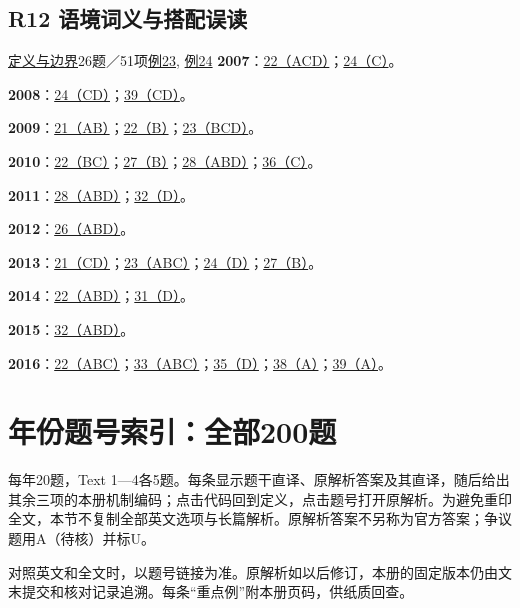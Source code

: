 \documentclass[11pt,a4paper]{article}
\begin{document}
\subsection{R12 语境词义与搭配误读}\label{class-R12}
\noindent \hyperref[cat-R12]{定义与边界}\quad 26题／51项\quad \hyperref[case-2009-T1-Q23]{例23}, \hyperref[case-2013-T1-Q21]{例24}
\noindent\textbf{2007}：\hyperref[idx-2007-T1-Q22]{22（ACD）}；\hyperref[idx-2007-T1-Q24]{24（C）}。\par
\noindent\textbf{2008}：\hyperref[idx-2008-T1-Q24]{24（CD）}；\hyperref[idx-2008-T4-Q39]{39（CD）}。\par
\noindent\textbf{2009}：\hyperref[idx-2009-T1-Q21]{21（AB）}；\hyperref[idx-2009-T1-Q22]{22（B）}；\hyperref[idx-2009-T1-Q23]{23（BCD）}。\par
\noindent\textbf{2010}：\hyperref[idx-2010-T1-Q22]{22（BC）}；\hyperref[idx-2010-T2-Q27]{27（B）}；\hyperref[idx-2010-T2-Q28]{28（ABD）}；\hyperref[idx-2010-T4-Q36]{36（C）}。\par
\noindent\textbf{2011}：\hyperref[idx-2011-T2-Q28]{28（ABD）}；\hyperref[idx-2011-T3-Q32]{32（D）}。\par
\noindent\textbf{2012}：\hyperref[idx-2012-T2-Q26]{26（ABD）}。\par
\noindent\textbf{2013}：\hyperref[idx-2013-T1-Q21]{21（CD）}；\hyperref[idx-2013-T1-Q23]{23（ABC）}；\hyperref[idx-2013-T1-Q24]{24（D）}；\hyperref[idx-2013-T2-Q27]{27（B）}。\par
\noindent\textbf{2014}：\hyperref[idx-2014-T1-Q22]{22（ABD）}；\hyperref[idx-2014-T3-Q31]{31（D）}。\par
\noindent\textbf{2015}：\hyperref[idx-2015-T3-Q32]{32（ABD）}。\par
\noindent\textbf{2016}：\hyperref[idx-2016-T1-Q22]{22（ABC）}；\hyperref[idx-2016-T3-Q33]{33（ABC）}；\hyperref[idx-2016-T3-Q35]{35（D）}；\hyperref[idx-2016-T4-Q38]{38（A）}；\hyperref[idx-2016-T4-Q39]{39（A）}。\par
{}\section{年份题号索引：全部200题}\label{year-index}
每年20题，Text 1—4各5题。每条显示题干直译、原解析答案及其直译，随后给出其余三项的本册机制编码；点击代码回到定义，点击题号打开原解析。为避免重印全文，本节不复制全部英文选项与长篇解析。原解析答案不另称为官方答案；争议题用A（待核）并标U。\par
对照英文和全文时，以题号链接为准。原解析如以后修订，本册的固定版本仍由文末提交和核对记录追溯。每条“重点例”附本册页码，供纸质回查。\par
\clearpage
\end{document}
